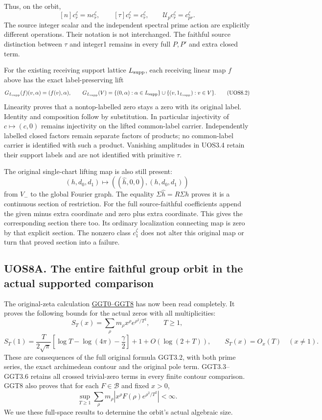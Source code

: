 Thus, on the orbit, \[
 [n]c_r^\zeta=n c_r^\zeta,\qquad
 [\tau]c_r^\zeta=c_r^\zeta,\qquad
 \mathcal U_p c_r^\zeta=c_{pr}^\zeta.
 \tag{UOS8.1}
\] The source integer scalar and the independent spectral prime action
are explicitly different operations. Their notation is not interchanged.
The faithful source distinction between \(\tau\) and integer1 remains in
every full \(P,P'\) and extra closed term.

For the existing receiving support lattice \(L_{\rm supp}\), each
receiving linear map \(f\) above has the exact label-preserving lift \[
 G_{L_{\rm supp}}(f)(v,\alpha)=(f(v),\alpha),\qquad
 G_{L_{\rm supp}}(V)=
 \{(0,\alpha):\alpha\in L_{\rm supp}\}
 \cup\{(v,1_{L_{\rm supp}}):v\in V\}.
 \tag{UOS8.2}
\] Linearity proves that a nontop-labelled zero stays a zero with its
original label. Identity and composition follow by substitution. In
particular injectivity of \(c\mapsto(c,0)\) remains injectivity on the
lifted common-label carrier. Independently labelled closed factors
remain separate factors of products; no common-label carrier is
identified with such a product. Vanishing amplitudes in UOS3.4 retain
their support labels and are not identified with primitive \(\tau\).

The original single-chart lifting map is also still present: \[
 (h,d_0,d_1)\longmapsto
 ((\widehat h,0,0),(h,d_0,d_1))
\] from \(V_-\) to the global Fourier graph. The equality
\(\Sigma\widehat h=R\Sigma h\) proves it is a continuous section of
restriction. For the full source-faithful coefficients append the given
minus extra coordinate and zero plus extra coordinate. This gives the
corresponding section there too. Its ordinary localization connecting
map is zero by that explicit section. The nonzero class \(c_1^\zeta\)
does not alter this original map or turn that proved section into a
failure.

\subsection{UOS8A. The entire faithful group orbit in the actual
supported
comparison}\label{uos8a.-the-entire-faithful-group-orbit-in-the-actual-supported-comparison}

The original-zeta calculation
\href{GLOBAL_GAUSSIAN_ORIGINAL_ZETA_TRACE.md}{GGT0--GGT8} has now been
read completely. It proves the following bounds for the actual zeros
with all multiplicities: \[
 S_T(x)=\sum_{\rho}m_\rho x^\rho e^{\rho^2/T^2},\qquad T\ge1,
\] \[
 S_T(1)=\frac{T}{2\sqrt\pi}
 \left[\log T-\log(4\pi)-\frac\gamma2\right]
 +1+O(\log(2+T)),\qquad
 S_T(x)=O_x(T)\quad(x\ne1).
 \tag{UOS8A.1}
\] These are consequences of the full original formula GGT3.2, with both
prime series, the exact archimedean contour and the original pole term.
GGT3.3--GGT3.6 retains all crossed trivial-zero terms in every finite
contour comparison. GGT8 also proves that for each \(F\in\mathcal B\)
and fixed \(x>0\), \[
 \sup_{T\ge1}\sum_\rho m_\rho
 |x^\rho F(\rho)e^{\rho^2/T^2}|<\infty .
 \tag{UOS8A.2}
\] We use these full-space results to determine the orbit's actual
algebraic size.

